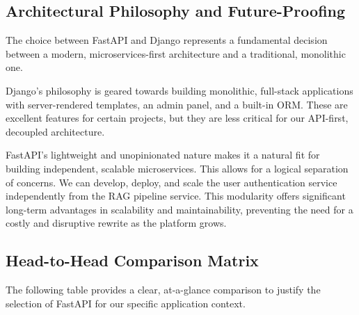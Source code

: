 \subsection{Architectural Philosophy and Future-Proofing}
The choice between FastAPI and Django represents a fundamental decision between a modern, microservices-first architecture and a traditional, monolithic one.

Django's philosophy is geared towards building monolithic, full-stack applications with server-rendered templates, an admin panel, and a built-in ORM. These are excellent features for certain projects, but they are less critical for our API-first, decoupled architecture.

FastAPI's lightweight and unopinionated nature makes it a natural fit for building independent, scalable microservices. This allows for a logical separation of concerns. We can develop, deploy, and scale the user authentication service independently from the RAG pipeline service. This modularity offers significant long-term advantages in scalability and maintainability, preventing the need for a costly and disruptive rewrite as the platform grows.

\subsection{Head-to-Head Comparison Matrix}
The following table provides a clear, at-a-glance comparison to justify the selection of FastAPI for our specific application context.

